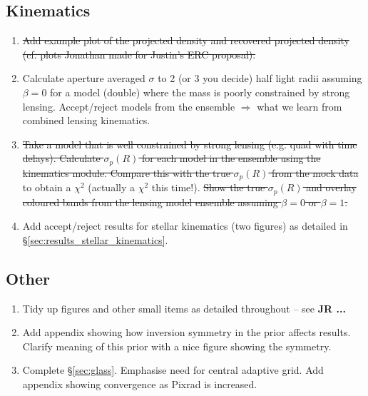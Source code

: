 \documentclass[galley,usenatbib]{mn2e}
\begin{document}
\subsection{Kinematics}

\begin{enumerate}

\item \sout{Add example plot of the projected density and recovered
  projected density (cf. plots Jonathan made for Justin's ERC
proposal).}

\item Calculate aperture averaged $\sigma$ to 2 (or 3 you decide) half
  light radii assuming $\beta = 0$ for a model (double) where the mass
  is poorly constrained by strong lensing. Accept/reject models from
  the ensemble $\Longrightarrow$ what we learn from combined lensing
  kinematics.

\item \sout{Take a model that is well constrained by strong lensing
  (e.g. quad with time delays). Calculate $\sigma_p(R)$ for each model
  in the ensemble using the kinematics module. Compare this with the
true $\sigma_p(R)$ from the mock data} to obtain a $\chi^2$ (actually
  a $\chi^2$ this time!).  \sout{Show the true $\sigma_p(R)$ and overlay
  coloured bands from the lensing model ensemble assuming $\beta = 0$
or $\beta = 1$.}

\item Add accept/reject results for stellar kinematics (two figures)
  as detailed in \S\ref{sec:results_stellar_kinematics}.

\end{enumerate}

\subsection{Other}

\begin{enumerate}

\item Tidy up figures and other small items as detailed throughout --
  see {\bf JR ... }

\item Add appendix showing how inversion symmetry in the prior affects
  results. Clarify meaning of this prior with a nice figure showing
  the symmetry.

\item Complete \S\ref{sec:glass}. Emphasise need for central adaptive
  grid. Add appendix showing convergence as Pixrad is increased.

\end{enumerate}
\end{document}
